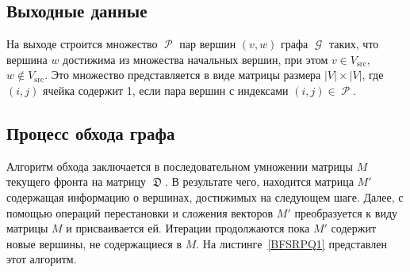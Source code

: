 \subsection{Выходные данные}

На выходе строится множество $\mscrP$ пар вершин $(v, w)$ графа $\mscrG$ таких, что вершина $w$ достижима из множества начальных вершин, при этом $v \in V_{\mathrm{src}}$, $w \not\in V_{\mathrm{src}}$.
Это множество представляется в виде матрицы размера $|V| \times |V|$, где $(i,j)$ ячейка содержит 1, если пара вершин с индексами $(i, j) \in \mscrP$.

\subsection{Процесс обхода графа}

Алгоритм обхода заключается в последовательном умножении матрицы $M$ текущего фронта на матрицу $\mfrakD$.
В результате чего, находится матрица $M'$ содержащая информацию о вершинах, достижимых на следующем шаге.
Далее, с помощью операций перестановки и сложения векторов $M'$ преобразуется к виду матрицы $M$ и присваивается ей.
Итерации продолжаются пока $M'$ содержит новые вершины, не содержащиеся в $M$. На листинге~\ref{BFSRPQ1} представлен этот алгоритм.



